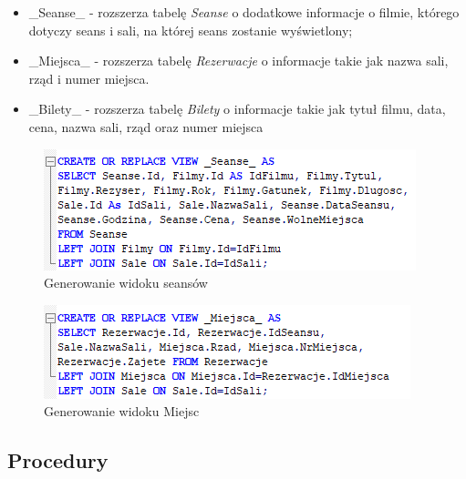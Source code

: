 \begin{itemize}
	\item \_Seanse\_ - rozszerza tabelę \textit{Seanse} o dodatkowe informacje o filmie, którego dotyczy seans i sali, na której seans zostanie wyświetlony;
	\item \_Miejsca\_ - rozszerza tabelę \textit{Rezerwacje} o informacje takie jak nazwa sali, rząd i numer miejsca.
	\item \_Bilety\_ - rozszerza tabelę \textit{Bilety} o informacje takie jak tytuł filmu, data, cena, nazwa sali, rząd oraz numer miejsca
\end{itemize}

\begin{figure} [H]
	\centering
	\includegraphics[width=0.6\linewidth]{rozdzial04/V_Seanse_.png}
	\caption{Generowanie widoku seansów}
	\label{fig:v_seanse}
\end{figure}

\begin{figure} [H]
	\centering
	\includegraphics[width=0.6\linewidth]{rozdzial04/V_Miejsca_.png}
	\caption{Generowanie widoku Miejsc}
	\label{fig:v_miejsca}
\end{figure}

\subsection{Procedury}

